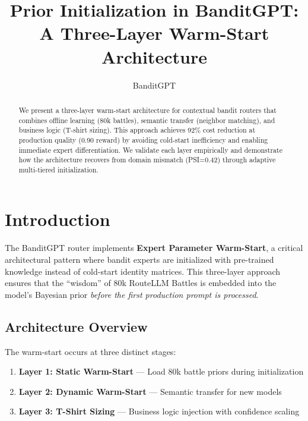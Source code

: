 \documentclass[sigconf]{acmart}
\begin{document}
\title{Prior Initialization in BanditGPT: \\
A Three-Layer Warm-Start Architecture}

\author{BanditGPT}

\begin{abstract}
We present a three-layer warm-start architecture for contextual bandit routers that combines offline learning (80k battles), semantic transfer (neighbor matching), and business logic (T-shirt sizing). This approach achieves 92\% cost reduction at production quality (0.90 reward) by avoiding cold-start inefficiency and enabling immediate expert differentiation. We validate each layer empirically and demonstrate how the architecture recovers from domain mismatch (PSI=0.42) through adaptive multi-tiered initialization.
\end{abstract}

\maketitle

\section{Introduction}

The BanditGPT router implements \textbf{Expert Parameter Warm-Start}, a critical architectural pattern where bandit experts are initialized with pre-trained knowledge instead of cold-start identity matrices. This three-layer approach ensures that the ``wisdom'' of 80k RouteLLM Battles is embedded into the model's Bayesian prior \emph{before the first production prompt is processed}.

\subsection{Architecture Overview}

The warm-start occurs at three distinct stages:

\begin{enumerate}
    \item \textbf{Layer 1: Static Warm-Start} --- Load 80k battle priors during initialization
    \item \textbf{Layer 2: Dynamic Warm-Start} --- Semantic transfer for new models
    \item \textbf{Layer 3: T-Shirt Sizing} --- Business logic injection with confidence scaling
\end{enumerate}
\end{document}
